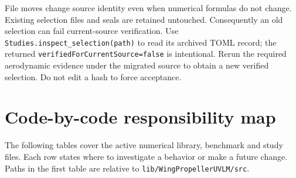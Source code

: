 \documentclass[11pt,a4paper]{article}
\newcommand{\code}{\nolinkurl}
\begin{document}
File moves change source identity even when numerical formulas do not change.
Existing selection files and seals are retained untouched. Consequently an
old selection can fail current-source verification. Use
\code{Studies.inspect_selection(path)} to read its archived TOML record;
the returned \code{verifiedForCurrentSource=false} is intentional. Rerun the
required aerodynamic evidence under the migrated source to obtain a new
verified selection. Do not edit a hash to force acceptance.

\section{Code-by-code responsibility map}
\label{sec:files}

The following tables cover the active numerical library, benchmark and study
files. Each row states where to investigate a behavior or make a future
change. Paths in the first table are relative to \code{lib/WingPropellerUVLM/src}.
\end{document}
